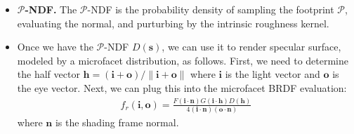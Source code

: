 \documentclass[10pt]{article}
\newcommand{\ve}[1]{\mathbf{#1}}
\begin{document}
\begin{itemize}
  	\item \textbf{$\mathcal{P}$-NDF.}  The $\mathcal{P}$-NDF is the probability density of sampling the footprint $\mathcal{P}$, evaluating the normal, and purturbing by the intrinsic roughness kernel.

  	\item Once we have the $\mathcal{P}$-NDF $D(\ve{s})$, we can use it to render specular surface, modeled by a microfacet distribution, as follows.  First, we need to determine the half vector $\ve{h} = (\ve{i} + \ve{o}) / \| \ve{i} + \ve{o} \|$ where $\ve{i}$ is the light vector and $\ve{o}$ is the eye vector.  Next, we can plug this into the microfacet BRDF evaluation:
  	\begin{align*}
  		f_r(\ve{i}, \ve{o}) = \frac{F(\ve{i}\cdot\ve{n}) G(\ve{i}\cdot \ve{h}) D(\ve{h})}{4(\ve{i} \cdot \ve{n}) (\ve{o} \cdot \ve{n})}
  	\end{align*}
  	where $\ve{n}$ is the shading frame normal.
  \end{itemize}
\end{document}
